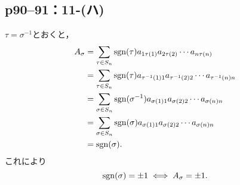 \subsection*{p90--91：11-(ハ)}

\begin{tproof}
  $ \tau = \sigma^{-1}$とおくと，
  \begin{align*}
    A_\sigma & = \sum_{ \tau \in S_n} \operatorname{sgn}  (\tau) a_{1 \tau(1)} a_{2 \tau(2)} \cdots a_{n \tau(n)}               \\
             & = \sum_{ \tau \in S_n} \operatorname{sgn}  (\tau) a_{\tau^{-1}(1)1} a_{\tau^{-1} (2)2} \cdots a_{\tau^{-1} (n)n} \\
             & = \sum_{\sigma \in S_n} \operatorname{sgn} (\sigma^{-1}) a_{\sigma(1)1} a_{\sigma(2)2} \cdots a_{\sigma(n)n}     \\
             & = \sum_{\sigma \in S_n} \operatorname{sgn} (\sigma) a_{\sigma(1)1} a_{\sigma(2)2} \cdots a_{\sigma(n)n}          \\
             & = \operatorname{sgn} (\sigma).
  \end{align*}
  これにより
  \[
    \operatorname{sgn} (\sigma) = \pm 1 \iff A_\sigma = \pm 1.
  \]
\end{tproof}

